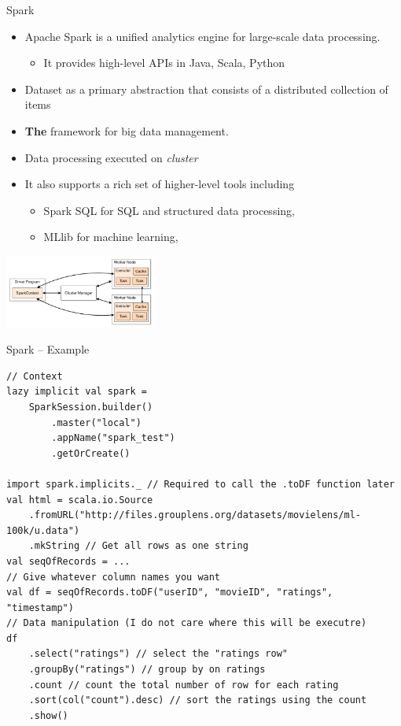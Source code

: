 \documentclass[presentation, 9pt]{beamer}\mode<presentation>{\usetheme{AMSBolognaFC}}
\begin{document}
\begin{frame}{Spark}
	\begin{itemize}
		\item Apache Spark is a unified analytics engine for large-scale data processing.
		\begin{itemize}
			\item It provides high-level APIs in Java, Scala, Python
		\end{itemize}
		\item Dataset as a primary abstraction that consists of a distributed collection of items 
  	\item \textbf{The} framework for big data management.
   \item Data processing executed on \emph{cluster}
   	\item It also supports a rich set of higher-level tools including 
		 \begin{itemize}
			\item Spark SQL for SQL and structured data processing, 
   		\item MLlib for machine learning,  
		 \end{itemize}
	\end{itemize}
	\centering
	\includegraphics[width=5cm]{img/cluster-overview.png}
\end{frame}
\begin{frame}[fragile]{Spark -- Example}
	\begin{alertblock}{}
		\begin{tcolorbox}[left=0pt, top=0pt, bottom=0pt]
			\begin{verbatim}
// Context
lazy implicit val spark =
	SparkSession.builder()
		.master("local")
		.appName("spark_test")
		.getOrCreate()

import spark.implicits._ // Required to call the .toDF function later
val html = scala.io.Source
	.fromURL("http://files.grouplens.org/datasets/movielens/ml-100k/u.data")
	.mkString // Get all rows as one string
val seqOfRecords = ...
// Give whatever column names you want
val df = seqOfRecords.toDF("userID", "movieID", "ratings", "timestamp")
// Data manipulation (I do not care where this will be executre)
df
	.select("ratings") // select the "ratings row"
	.groupBy("ratings") // group by on ratings
	.count // count the total number of row for each rating
	.sort(col("count").desc) // sort the ratings using the count
	.show()
			\end{verbatim}
		\end{tcolorbox}
	\end{alertblock}
\end{frame}
\end{document}

